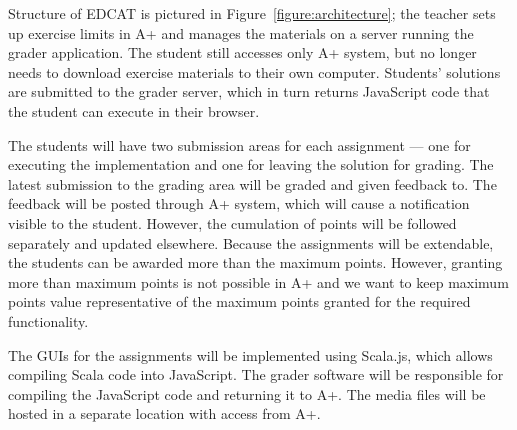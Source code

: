 Structure of EDCAT is pictured in Figure~\ref{figure:architecture}; the teacher sets up exercise limits in A+ and manages the materials on a server running the grader application. The student still accesses only A+ system, but no longer needs to download exercise materials to their own computer. Students' solutions are submitted to the grader server, which in turn returns JavaScript code that the student can execute in their browser.

The students will have two submission areas for each assignment --- one for executing the implementation and one for leaving the solution for grading. The latest submission to the grading area will be graded and given feedback to. The feedback will be posted through A+ system, which will cause a notification visible to the student. However, the cumulation of points will be followed separately and updated elsewhere. Because the assignments will be extendable, the students can be awarded more than the maximum points. However, granting more than maximum points is not possible in A+ and we want to keep maximum points value representative of the maximum points granted for the required functionality.

The GUIs for the assignments will be implemented using Scala.js, which allows compiling Scala code into JavaScript. The grader software will be responsible for compiling the JavaScript code and returning it to A+. The media files will be hosted in a separate location with access from A+.
